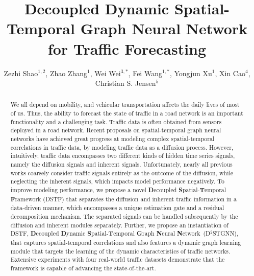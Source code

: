 \documentclass[sigconf, nonacm]{acmart}
\title{Decoupled Dynamic Spatial-Temporal Graph Neural Network for Traffic Forecasting}
\newcommand\vldbauthors{\authors}
\begin{document}
\author{Zezhi Shao$^{1,2}$, Zhao Zhang$^{1}$, Wei Wei$^{3, *}$, Fei Wang$^{1, *}$, Yongjun Xu$^{1}$, Xin Cao$^{4}$, Christian S. Jensen$^{5}$}


\renewcommand{\vldbauthors}{Zezhi Shao, Zhao Zhang, Wei Wei, Fei Wang, Yongjun Xu, Xin Cao, and Christian S. Jensen}
\begin{abstract}
We all depend on mobility, and vehicular transportation affects the daily lives of most of us.
Thus, the ability to forecast the state of traffic in a road network is an important functionality and {\color{black}a challenging task}.
Traffic data is {\color{black}often} obtained from sensors deployed in a road network. 
{\color{black}Recent proposals on spatial-temporal graph neural networks have achieved great progress at modeling complex spatial-temporal correlations in traffic data, by modeling traffic data as a diffusion process. 
However, intuitively, traffic data encompasses two different kinds of hidden time series signals, namely the diffusion signals and inherent signals.
Unfortunately, nearly all previous works coarsely consider traffic signals entirely as the outcome of the diffusion, while neglecting the inherent signals, which impacts model performance negatively.}
To improve modeling performance, {\color{black}we propose a novel \textbf{D}ecoupled \textbf{S}patial-\textbf{T}emporal \textbf{F}ramework (DSTF) that separates the diffusion and inherent traffic information in a data-driven manner, which encompasses a unique estimation gate and a residual decomposition mechanism.  
The separated signals can be handled subsequently by the diffusion and inherent modules separately.
Further, we propose an instantiation of DSTF, \textbf{D}ecoupled \textbf{D}ynamic \textbf{S}patial-\textbf{T}emporal \textbf{G}raph \textbf{N}eural \textbf{N}etwork~(D$^2$STGNN), that} captures spatial-temporal {\color{black}correlations} and also features a dynamic graph learning module that targets the learning of the dynamic characteristics of traffic networks. 
Extensive experiments with four real-world traffic datasets demonstrate that the framework is capable of advancing the state-of-the-art.
\end{abstract}
 \maketitle
\end{document}

